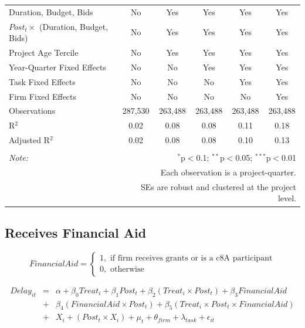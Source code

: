 \documentclass[
]{article}
\begin{document}
\begin{table}[H]
\begin{tabular}{@{\extracolsep{-2pt}}lccccc}
Duration, Budget, Bids & No & Yes & Yes & Yes & Yes \\ 
$Post_t \times $  (Duration, Budget, Bids) & No & Yes & Yes & Yes & Yes \\ 
Project Age Tercile & No & Yes & Yes & Yes & Yes \\ 
Year-Quarter Fixed Effects & No & No & Yes & Yes & Yes \\ 
Task Fixed Effects & No & No & No & Yes & Yes \\ 
Firm Fixed Effects & No & No & No & No & Yes \\ 
Observations & 287,530 & 263,488 & 263,488 & 263,488 & 263,488 \\ 
R$^{2}$ & 0.02 & 0.08 & 0.08 & 0.11 & 0.18 \\ 
Adjusted R$^{2}$ & 0.02 & 0.08 & 0.08 & 0.10 & 0.13 \\ 
\hline 
\hline \\[-1.8ex] 
\textit{Note:}  & \multicolumn{5}{r}{$^{*}$p$<$0.1; $^{**}$p$<$0.05; $^{***}$p$<$0.01} \\ 
 & \multicolumn{5}{r}{Each observation is a project-quarter.} \\ 
 & \multicolumn{5}{r}{SEs are robust and clustered at the project level.} \\ 
\end{tabular} 
\end{table}

\hypertarget{receives-financial-aid}{%
\subsection{Receives Financial Aid}\label{receives-financial-aid}}

\[ FinancialAid = \begin{cases} 1, \text{ if firm receives grants or is a c8A participant}\\
0, \text{ otherwise} \end{cases}\]

\[ \begin{aligned}
Delay_{it} &=& \alpha+\beta_0 Treat_i + \beta_1 Post_t + \beta_2 (Treat_i \times Post_t) +\beta_3 FinancialAid \\
&+& \beta_4 (FinancialAid \times Post_t) + \beta_5 (Treat_i \times Post_t \times FinancialAid) \\ 
&+&X_i + (Post_t \times X_i) + \mu_t + \theta_{firm} + \lambda_{task}+ \epsilon_{it}
\end{aligned}\]
\end{document}
